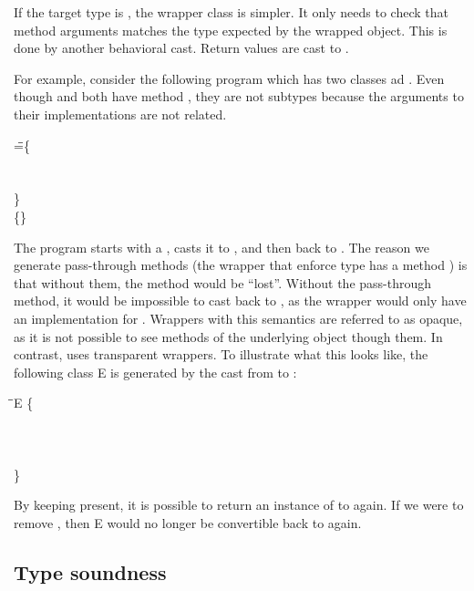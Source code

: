 \documentclass[USenglish]{tex/lipics-v2016}f
\begin{document}
If the target type is \any, the wrapper class is simpler. It only needs to
check that method arguments matches the type expected by the wrapped
object. This is done by another behavioral cast. Return values are cast to
\any.

For example, consider the following program which has two classes \C ad \D.
Even though \C and \D both have method \a, they are not subtypes because the
arguments to their \m implementations are not related.

\begin{tabbing}\small
\hspace{1cm}
 \HS\HS\HS\WHERE\HS
  \K\HS =\HS \= \class\= \C \{\\
       \> \HS \Mdef\m\x\any\any{\HS\x\HS}\\
       \> \HS \Mdef\n\x\any\any{\HS\x\HS}\\
       \> \}  \\
       \>\class \D \{\HS \Mdef\m\x\Int\Int{\HS\x\HS}\HS \}
\end{tabbing}

\noindent
The program starts with a \C, casts it to \D, and then back to \C. The
reason we generate pass-through methods (the wrapper that enforce type \D
has a method \n) is that without them, the method \n would be ``lost''. 
Without the pass-through method, it would be impossible to cast back to
\C, as the wrapper would only have an implementation for \m. Wrappers
with this semantics are referred to as opaque, as it is not possible
to see methods of the underlying object though them. In contrast,
\kafka uses transparent wrappers.
To illustrate what this looks like, the following class \xt E is generated
by the cast from \C to \D:

\begin{tabbing}\small
\HS\HS\=\class\= \xt E \{\\
\>\> \HS \Fdef\that\C \\
\>\> \HS \Mdef\m\x\Int\Int{\HS\BehCast\Int{\KCall\that\m{\BehCast\any\x}\any\any\HS}} \\ 
\>\> \HS \Mdef\n\x\any\any{\HS \KCall\that\n{\x}\any\any\HS} \\ 
\>\}
\end{tabbing}

\noindent
By keeping \n present, it is possible to return an instance of
\E to \C again. If we were to remove \n, then \xt E would no longer
be convertible back to \C again.    

\subsection{Type soundness}
\end{document}
